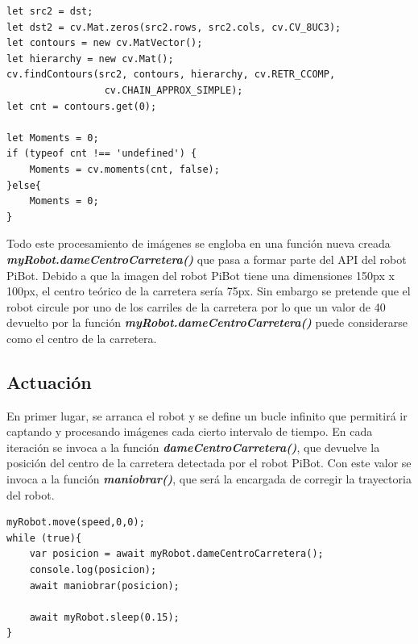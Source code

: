 \documentclass{report}
\begin{document}
\newpage
\begin{lstlisting}[backgroundcolor = \color{light-gray},
				   aboveskip = 2em,
				   belowskip = 2em,
                   xleftmargin = 2cm,
                   framexleftmargin = 1em,
                   basicstyle=\small]
let src2 = dst;
let dst2 = cv.Mat.zeros(src2.rows, src2.cols, cv.CV_8UC3);
let contours = new cv.MatVector();
let hierarchy = new cv.Mat();
cv.findContours(src2, contours, hierarchy, cv.RETR_CCOMP,
				 cv.CHAIN_APPROX_SIMPLE);
let cnt = contours.get(0);

let Moments = 0;
if (typeof cnt !== 'undefined') {
	Moments = cv.moments(cnt, false);
}else{
	Moments = 0;
}

\end{lstlisting}

Todo este procesamiento de imágenes se engloba en una función nueva creada \\ \textit{\textbf{myRobot.dameCentroCarretera()}} que pasa a formar parte del API del robot PiBot. Debido a que la imagen del robot PiBot tiene una dimensiones 150px x 100px, el centro teórico de la carretera sería 75px. Sin embargo se pretende que el robot circule por uno de los carriles de la carretera por lo que un valor de 40 devuelto por la función \textit{\textbf{myRobot.dameCentroCarretera()}} puede considerarse como el centro de la carretera.

\subsection{Actuación}

En primer lugar, se arranca el robot y se define un bucle infinito que permitirá ir captando y procesando imágenes cada cierto intervalo de tiempo. En cada iteración se invoca a la función \textit{\textbf{dameCentroCarretera()}}, que devuelve la posición del centro de la carretera detectada por el robot PiBot. Con este valor se invoca a la función \textit{\textbf{maniobrar()}}, que será la encargada de corregir la trayectoria del robot.

\begin{lstlisting}[backgroundcolor = \color{light-gray},
				   aboveskip = 2em,
				   belowskip = 2em,
                   xleftmargin = 2cm,
                   framexleftmargin = 1em,
                   basicstyle=\small]
myRobot.move(speed,0,0);                   
while (true){
	var posicion = await myRobot.dameCentroCarretera();
	console.log(posicion);
	await maniobrar(posicion);

	await myRobot.sleep(0.15);
}
\end{lstlisting}
\end{document}
